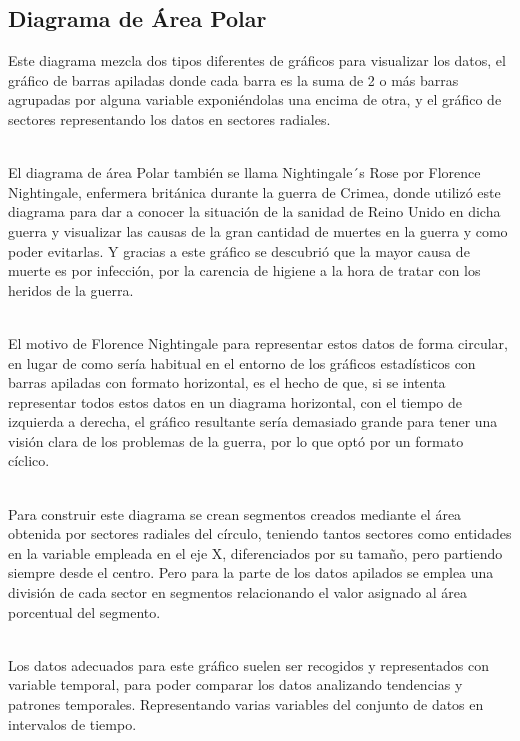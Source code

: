 \documentclass{article}\usepackage[]{graphicx}\usepackage[]{color}
\begin{document}
\subsection{Diagrama de \'Area Polar}
Este diagrama mezcla dos tipos diferentes de gr\'aficos para visualizar los datos, el gr\'afico de barras apiladas donde cada barra es la suma de 2 o m\'as barras agrupadas por alguna variable exponi\'endolas una encima de otra, y el gr\'afico de sectores representando los datos en sectores radiales.~\\~\par
El diagrama de \'area Polar tambi\'en se llama Nightingale´s Rose por Florence Nightingale, enfermera brit\'anica durante la guerra de Crimea, donde utiliz\'o este diagrama para dar a conocer la situaci\'on de la sanidad de Reino Unido en dicha guerra y visualizar las causas de la gran cantidad de muertes en la guerra y como poder evitarlas. Y gracias a este gr\'afico se descubri\'o que la mayor causa de muerte es por infecci\'on, por la carencia de higiene a la hora de tratar con los heridos de la guerra\cite{rose-book}.~\\~\par
El motivo de Florence Nightingale para representar estos datos de forma circular, en lugar de como ser\'ia habitual en el entorno de los gr\'aficos estad\'isticos con barras apiladas con formato horizontal, es el hecho de que, si se intenta representar todos estos datos en un diagrama horizontal, con el tiempo de izquierda a derecha, el gr\'afico resultante ser\'ia demasiado grande para tener una visi\'on clara de los problemas de la guerra, por lo que opt\'o por un formato c\'iclico\cite{rose-desing}.~\\~\par
Para construir este diagrama se crean segmentos creados mediante el \'area obtenida por sectores radiales del c\'irculo, teniendo tantos sectores como entidades en la variable empleada en el eje X, diferenciados por su tama\~no, pero partiendo siempre desde el centro. Pero para la parte de los datos apilados se emplea una divisi\'on de cada sector en segmentos relacionando el valor asignado al \'area porcentual del segmento\cite{rose-desing}.~\\~\par
Los datos adecuados para este gr\'afico suelen ser recogidos y representados con variable temporal, para poder comparar los datos analizando tendencias y patrones temporales. Representando varias variables del conjunto de datos en intervalos de tiempo\cite{rose}.~\\~\par
\end{document}

